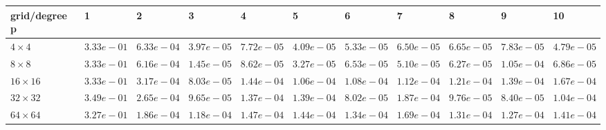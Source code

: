 \begin{tabular}{lllllllllll}
\hline
 grid/degree p   & 1          & 2          & 3          & 4          & 5          & 6          & 7          & 8          & 9          & 10         \\
\hline
 $4 \times 4$    & $3.33e-01$ & $6.33e-04$ & $3.97e-05$ & $7.72e-05$ & $4.09e-05$ & $5.33e-05$ & $6.50e-05$ & $6.65e-05$ & $7.83e-05$ & $4.79e-05$ \\
 $8 \times 8$    & $3.33e-01$ & $6.16e-04$ & $1.45e-05$ & $8.62e-05$ & $3.27e-05$ & $6.53e-05$ & $5.10e-05$ & $6.27e-05$ & $1.05e-04$ & $6.86e-05$ \\
 $16 \times 16$  & $3.33e-01$ & $3.17e-04$ & $8.03e-05$ & $1.44e-04$ & $1.06e-04$ & $1.08e-04$ & $1.12e-04$ & $1.21e-04$ & $1.39e-04$ & $1.67e-04$ \\
 $32 \times 32$  & $3.49e-01$ & $2.65e-04$ & $9.65e-05$ & $1.37e-04$ & $1.39e-04$ & $8.02e-05$ & $1.87e-04$ & $9.76e-05$ & $8.40e-05$ & $1.04e-04$ \\
 $64 \times 64$  & $3.27e-01$ & $1.86e-04$ & $1.18e-04$ & $1.47e-04$ & $1.44e-04$ & $1.34e-04$ & $1.69e-04$ & $1.31e-04$ & $1.27e-04$ & $1.41e-04$ \\
\hline
\end{tabular}